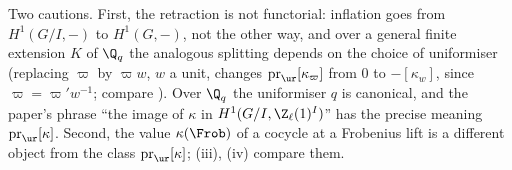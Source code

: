 \begin{remark}
Two cautions. First, the retraction is not functorial: inflation goes from $H^1(G/I,-)$ to $H^1(G,-)$, not the other way, and over a general finite extension $K$ of
$\Q_q$ the analogous splitting depends on the choice of uniformiser (replacing $\varpi$ by $\varpi w$, $w$ a unit, changes $\operatorname{pr}_{\ur}[\kappa_\varpi]$ from $0$ to
$-[\kappa_w]$, since $\varpi=\varpi'w^{-1}$; compare ). Over $\Q_q$ the uniformiser $q$ is canonical, and the paper's phrase ``the image of $\kappa$ in $H^1(G/I,\Z_\ell(1)^I)$'' has the precise meaning
$\operatorname{pr}_{\ur}[\kappa]$. Second, the value $\kappa(\Frob)$ of a cocycle at a Frobenius lift is a different object from the class $\operatorname{pr}_{\ur}[\kappa]$;
(iii), (iv) compare them.
\end{remark}


